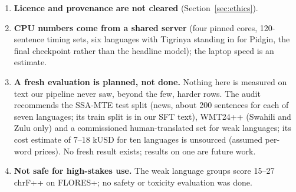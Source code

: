 \begin{enumerate}[label=\arabic*.]
\item \textbf{Licence and provenance are not cleared} (Section~\ref{sec:ethics}).
\item \textbf{CPU numbers come from a shared server} (four pinned cores, 120-sentence timing sets, six languages with Tigrinya standing in for Pidgin, the final checkpoint rather than the headline model); the laptop speed is an estimate.
\item \textbf{A fresh evaluation is planned, not done.} Nothing here is measured on text our pipeline never saw, beyond the few, harder \clean{} rows. The audit recommends the SSA-MTE test split (news, about 200 sentences for each of seven languages; its train split is in our SFT text), WMT24++ (Swahili and Zulu only) and a commissioned human-translated set for weak languages; its cost estimate of 7--18 kUSD for ten languages is unsourced (assumed per-word prices). No fresh result exists; results on one are future work.
\item \textbf{Not safe for high-stakes use.} The weak language groups score 15--27 chrF++ on FLORES+; no safety or toxicity evaluation was done.
\end{enumerate}
